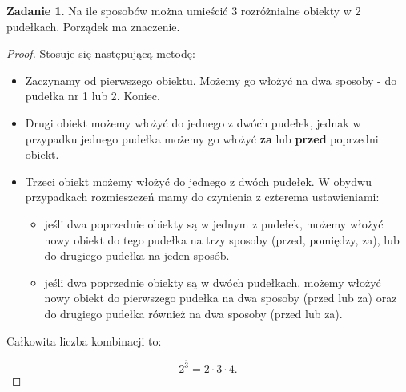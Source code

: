 \documentclass[11pt]{article}
\theoremstyle{definition}
\newtheorem{zadanie}{Zadanie}
\numberwithin{zadanie}{subsection}
\begin{document}
\begin{zadanie}
    Na ile sposobów można umieścić 3 rozróżnialne obiekty w 2 pudełkach. Porządek ma znaczenie.
\end{zadanie}
\begin{proof}
    Stosuje się następującą metodę:
    \begin{itemize}
        \item Zaczynamy od pierwszego obiektu. Możemy go włożyć na dwa sposoby - do pudełka nr 1 lub 2. Koniec.
        \item Drugi obiekt możemy włożyć do jednego z dwóch pudełek, jednak w przypadku jednego pudełka możemy go włożyć \textbf{za} lub \textbf{przed} poprzedni obiekt.
        \item Trzeci obiekt możemy włożyć do jednego z dwóch pudełek. W obydwu przypadkach rozmieszczeń mamy do czynienia z czterema ustawieniami:
              \begin{itemize}
                  \item jeśli dwa poprzednie obiekty są w jednym z pudełek, możemy włożyć nowy obiekt do tego pudełka na trzy sposoby (przed, pomiędzy, za), lub do drugiego pudełka na jeden sposób.
                  \item jeśli dwa poprzednie obiekty są w dwóch pudełkach, możemy włożyć nowy obiekt do pierwszego pudełka na dwa sposoby (przed lub za) oraz do drugiego pudełka również na dwa sposoby (przed lub za).
              \end{itemize}
    \end{itemize}
    Całkowita liczba kombinacji to:

    $$2^{\bar 3} = 2\cdot3\cdot4.$$
\end{proof}
\end{document}
